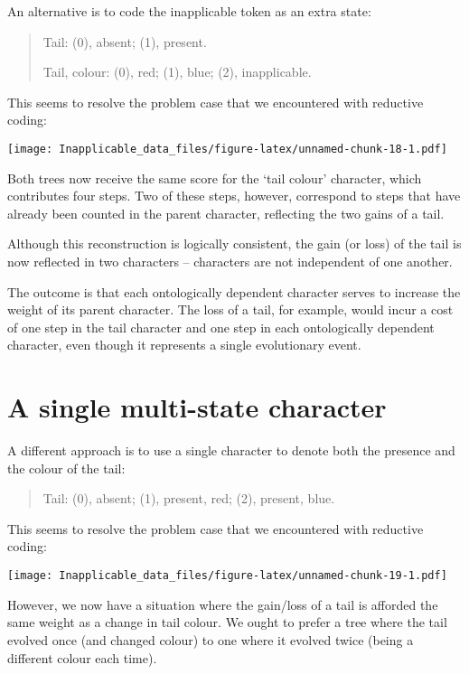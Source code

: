 \documentclass[]{book}
\theoremstyle{definition}
\theoremstyle{definition}
\theoremstyle{definition}
\theoremstyle{remark}
\begin{document}
An alternative is to code the inapplicable token as an extra state:

\begin{quote}
Tail: (0), absent; (1), present.

Tail, colour: (0), red; (1), blue; (2), inapplicable.
\end{quote}

This seems to resolve the problem case that we encountered with
reductive coding:

\texttt{[image: Inapplicable\_data\_files/figure-latex/unnamed-chunk-18-1.pdf]}

Both trees now receive the same score for the `tail colour' character,
which contributes four steps. Two of these steps, however, correspond to
steps that have already been counted in the parent character, reflecting
the two gains of a tail.

Although this reconstruction is logically consistent, the gain (or loss)
of the tail is now reflected in two characters -- characters are not
independent of one another.

The outcome is that each ontologically dependent character serves to
increase the weight of its parent character. The loss of a tail, for
example, would incur a cost of one step in the tail character and one
step in each ontologically dependent character, even though it
represents a single evolutionary event.

\hypertarget{a-single-multi-state-character}{%
\section{A single multi-state
character}\label{a-single-multi-state-character}}

A different approach is to use a single character to denote both the
presence and the colour of the tail:

\begin{quote}
Tail: (0), absent; (1), present, red; (2), present, blue.
\end{quote}

This seems to resolve the problem case that we encountered with
reductive coding:

\texttt{[image: Inapplicable\_data\_files/figure-latex/unnamed-chunk-19-1.pdf]}

However, we now have a situation where the gain/loss of a tail is
afforded the same weight as a change in tail colour. We ought to prefer
a tree where the tail evolved once (and changed colour) to one where it
evolved twice (being a different colour each time).
\end{document}

